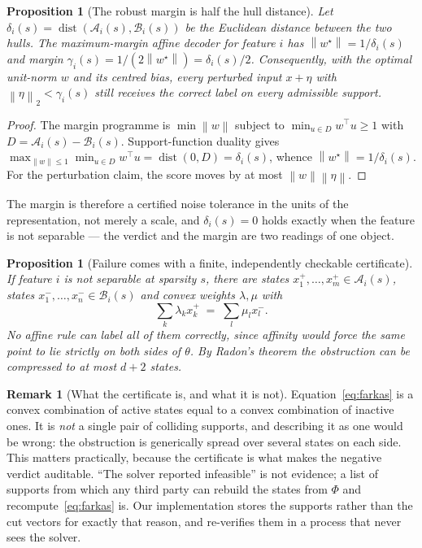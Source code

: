 \documentclass[preprint,12pt]{elsarticle}
\newtheorem{proposition}[theorem]{Proposition}
\theoremstyle{definition}
\newtheorem{remark}[theorem]{Remark}
\newcommand{\norm}[1]{\left\lVert #1 \right\rVert}
\begin{document}
\begin{proposition}[The robust margin is half the hull distance]
\label{prop:margin}
Let $\delta_i(s)=\operatorname{dist}(\mathcal A_i(s),\mathcal B_i(s))$ be the Euclidean distance
between the two hulls. The maximum-margin affine decoder for feature $i$ has
$\norm{w^{\star}}=1/\delta_i(s)$ and margin $\gamma_i(s)=1/(2\norm{w^{\star}})=\delta_i(s)/2$.
Consequently, with the optimal unit-norm $w$ and its centred bias, every perturbed input
$x+\eta$ with $\norm{\eta}_2<\gamma_i(s)$ still receives the correct label on every admissible
support.
\end{proposition}

\begin{proof}
The margin programme is $\min\norm{w}$ subject to $\min_{u\in D}w^{\top}u\ge1$ with
$D=\mathcal A_i(s)-\mathcal B_i(s)$. Support-function duality gives
$\max_{\norm{w}\le1}\min_{u\in D}w^{\top}u=\operatorname{dist}(0,D)=\delta_i(s)$, whence
$\norm{w^{\star}}=1/\delta_i(s)$. For the perturbation claim, the score moves by at most
$\norm{w}\norm{\eta}$.
\end{proof}

The margin is therefore a certified noise tolerance in the units of the representation, not
merely a scale, and $\delta_i(s)=0$ holds exactly when the feature is not separable --- the
verdict and the margin are two readings of one object.

\begin{proposition}[Failure comes with a finite, independently checkable certificate]
\label{prop:farkas}
If feature $i$ is not separable at sparsity $s$, there are states
$x^{+}_1,\dots,x^{+}_m\in\mathcal A_i(s)$, states $x^{-}_1,\dots,x^{-}_n\in\mathcal B_i(s)$ and
convex weights $\lambda,\mu$ with
\begin{equation}
  \sum_{k}\lambda_kx^{+}_k\;=\;\sum_{l}\mu_lx^{-}_l .
  \label{eq:farkas}
\end{equation}
No affine rule can label all of them correctly, since affinity would force the same point to lie
strictly on both sides of $\theta$. By Radon's theorem the obstruction can be compressed to at
most $d+2$ states.
\end{proposition}

\begin{remark}[What the certificate is, and what it is not]
\label{rem:cert}
Equation~\eqref{eq:farkas} is a convex combination of active states equal to a convex combination
of inactive ones. It is \emph{not} a single pair of colliding supports, and describing it as one
would be wrong: the obstruction is generically spread over several states on each side. This
matters practically, because the certificate is what makes the negative verdict auditable. ``The
solver reported infeasible'' is not evidence; a list of supports from which any third party can
rebuild the states from $\Phi$ and recompute~\eqref{eq:farkas} is. Our implementation stores the
supports rather than the cut vectors for exactly that reason, and re-verifies them in a process
that never sees the solver.
\end{remark}
\end{document}
